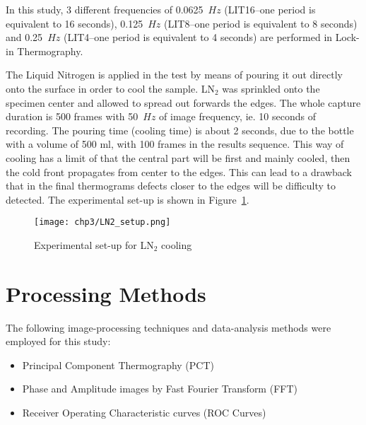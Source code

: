 In this study, 3 different frequencies of 0.0625~$Hz$ (LIT16--one period is equivalent to 16 seconds), 0.125~$Hz$ (LIT8--one period is equivalent to 8 seconds) and 0.25~$Hz$ (LIT4--one period is equivalent to 4 seconds) are performed in Lock-in Thermography. 


The Liquid Nitrogen is applied in the test by means of pouring it out directly onto the surface in order to cool the sample. LN$_2$ was sprinkled onto the specimen center and allowed to spread out forwards the edges. The whole capture duration is 500 frames with 50~$Hz$ of image frequency, ie. 10 seconds of recording. The pouring time (cooling time) is about 2 seconds, due to the bottle with a volume of 500 ml, with 100 frames in the results sequence. This way of cooling has a limit of that the central part will be first and mainly cooled, then the cold front propagates from center to the edges. This can lead to a drawback that in the final thermograms defects closer to the edges will be difficulty to detected. The experimental set-up is shown in Figure~\ref{Exp_LN2}.

\begin{figure}[ht]
   \centering
   \texttt{[image: chp3/LN2\_setup.png]}
   \caption{Experimental set-up for LN$_2$ cooling}
   \label{Exp_LN2}
\end{figure}




\section{Processing Methods} %
\label{sec:processing_methods}
The following image-processing techniques and data-analysis methods were employed for this study:
\begin{itemize}
   \item Principal Component Thermography (PCT)
   \item Phase and Amplitude images by Fast Fourier Transform (FFT)
   \item Receiver Operating Characteristic curves (ROC Curves)
\end{itemize}


